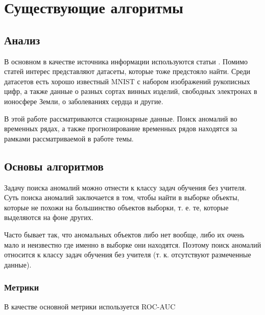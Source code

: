 \chapter{Существующие алгоритмы} \label{ch:ch2}

\section{Анализ} \label{sec:ch2/sec1}

В основном в качестве источника информации используются статьи \cite{dai, hodge, vakili, varun, billor, wilkinson}. Помимо статей интерес представляют датасеты, которые тоже предстояло найти. Среди датасетов есть хорошо известный MNIST с набором изображений рукописных цифр, а также данные о разных сортах винных изделий, свободных электронах в ионосфере Земли, о заболеваниях сердца и другие. \cite{billor}

В этой работе рассматриваются стационарные данные. Поиск аномалий во временных рядах, а также прогнозирование временных рядов находятся за рамками рассматриваемой в работе темы.

\section{Основы алгоритмов} \label{sec:ch2/sec2}

Задачу поиска аномалий можно отнести к классу задач обучения без учителя. Суть поиска аномалий заключается в том, чтобы найти в выборке объекты, которые не похожи на большинство объектов выборки, т. е. те, которые выделяются на фоне других.

Часто бывает так, что аномальных объектов либо нет вообще, либо их очень мало и неизвестно где именно в выборке они находятся. Поэтому поиск аномалий относится к классу задач обучения без учителя (т. к. отсутствуют размеченные данные).

\subsection{Метрики}


В качестве основной метрики используется ROC-AUC

